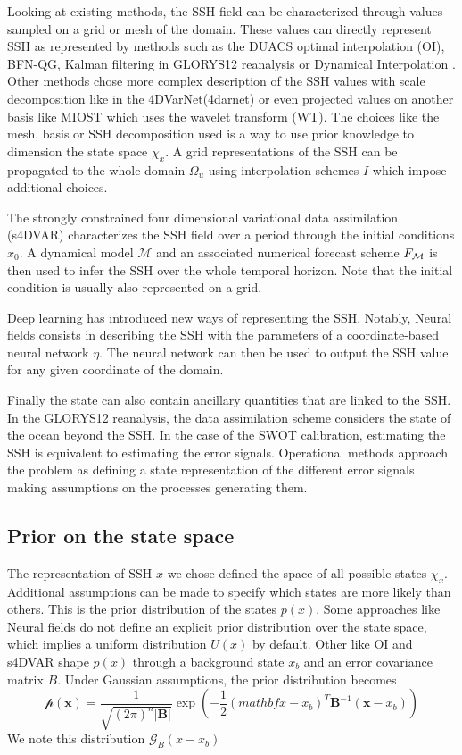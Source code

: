 \begin{bibunit}
  Looking at existing methods, the SSH field can be characterized through values sampled on a grid or mesh of the domain. These values can directly represent SSH as represented by methods such as the DUACS optimal interpolation\cite{} (OI), BFN-QG\cite{}, Kalman filtering in GLORYS12 reanalysis\cite{} or Dynamical Interpolation\cite{} .
  Other methods chose more complex description of the SSH values with scale decomposition like in the 4DVarNet\cite{}(4darnet) or even projected values on another basis like MIOST\cite{} which uses the wavelet transform (WT).
  The choices like the mesh, basis or SSH decomposition used is a way to use prior knowledge to dimension the state space $\chi_x$. A grid representations of the SSH can be propagated to the whole domain $\Omega_u$ using interpolation schemes $I$ which impose additional choices.

  The strongly constrained four dimensional variational data assimilation (s4DVAR)\cite{} characterizes the SSH field over a period through the initial conditions $x_0$. A dynamical model $\mathcal{M}$ and an associated numerical forecast scheme  $F_{\cal{M}}$ is then used to infer the SSH over the whole temporal horizon. Note that the initial condition is usually also represented on a grid. 

Deep learning has introduced new ways of representing the SSH. Notably, Neural fields\cite{} consists in describing the SSH with the parameters of a coordinate-based neural network $\eta$. The neural network can then be used to output the SSH value for any given coordinate of the domain.


Finally the state can also contain ancillary quantities that are linked to the SSH. In the GLORYS12\cite{} reanalysis, the data assimilation scheme considers the state of the ocean beyond the SSH. 
In the case of the SWOT calibration, estimating the SSH is equivalent to estimating the error signals. Operational methods\cite{} approach the problem as defining a state representation of the different error signals making assumptions on the processes generating them.

\subsection{Prior on the state space}
The representation of SSH $x$ we chose defined the space of all possible states $\chi_x$. Additional assumptions can be made to specify which states are more likely than others. This is the prior distribution of the states $p(x)$.
Some approaches like Neural fields do not define an explicit prior distribution over the state space, which implies a uniform distribution $U(x)$ by default.
Other like OI and s4DVAR shape $p(x)$ through a background state $x_b$ and an error covariance matrix $B$. Under Gaussian assumptions, the prior distribution becomes 
 $$\mathcal{p}(\mathbf{x}) = \frac{1}{\sqrt{(2\pi)^n |\mathbf{B}|}} \exp\left(-\frac{1}{2} (mathbf{x} - x_b)^T \mathbf{B}^{-1} (\mathbf{x} - x_b)\right)$$
  We note this distribution $\mathcal{G}_B(x - x_b)$


\end{bibunit}
